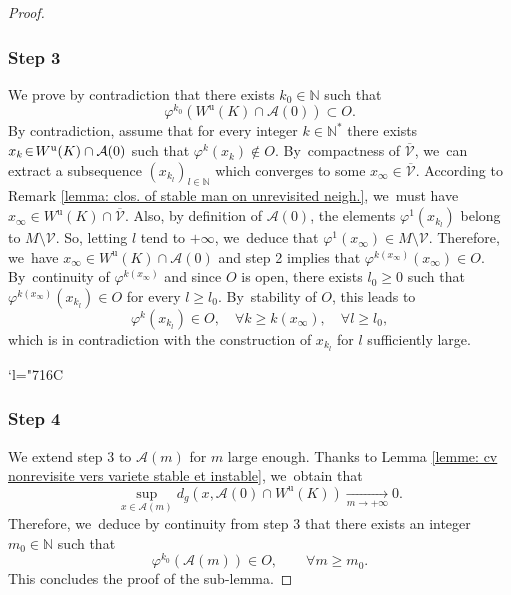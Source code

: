\documentclass[JEP,XML,SOM,Unicode,NoEqCountersInSection,NoFloatCountersInSection,published]{cedram}
\newcommand{\Changelback}{\mathcode`l="716C}
\newcommand{\ru}{\mathrm{u}}
\theoremstyle{definition}
\theoremstyle{plain}
\newcommand{\Acal}{\mathcal{A}}
\newcommand{\N}{\mathbb{N}}
\newcommand{\Vcal}{\mathcal{V}}
\begin{document}
\begin{proof}
\subsubsection*{Step 3} We prove by contradiction that there exists $k_0 \in \N$ such that
\[
\varphi^{k_0} (W^\ru (K) \cap \Acal(0)) \subset O.
\]
By contradiction, assume that for every integer $k \in \N^*$ there exists $x_k\!\in\! W^\ru (K) \cap\nobreak \Acal (0)$ such that $\varphi^{k} (x_k) \notin O$. By~compactness of $\overline{\Vcal}$, we~can extract a subsequence $(x_{k_l})_{l \in \N}$ which converges to some $x_{\infty} \in \overline{\Vcal}$. According to Remark \ref{lemma: clos. of stable man on unrevisited neigh.}, we~must have $x_{\infty} \in W^\ru (K) \cap \overline{\Vcal}$. Also, by definition of $\Acal (0)$, the elements $\varphi^1 (x_{k_l})$ belong to $M \setminus \Vcal$. So, letting $l$ tend to $+\infty$, we~deduce that $\varphi^1 (x_{\infty}) \in M \setminus \Vcal $. Therefore, we~have $x_{\infty} \in W^\ru (K) \cap \Acal (0)$ and step 2 implies that $\varphi^{k (x_{\infty})} (x_{\infty}) \in O$. By~continuity of $\varphi^{k (x_{\infty})}$ and since $O$ is open, there exists $l_0 \geq 0$ such that $\varphi^{k (x_{\infty})} (x_{k_l}) \in O$ for every $l \geq l_0$. By~stability of $O$, this leads to
\[
\varphi^{k} (x_{k_l}) \in O, \quad \forall k \geq k(x_{\infty}), \quad \forall l \geq l_0,
\]
which is in contradiction with the construction of $x_{k_l}$ for $l$ sufficiently large.

\Changelback

\subsubsection*{Step 4} We extend step 3 to $\Acal (m)$ for $m$ large enough. Thanks to Lemma \ref{lemme: cv nonrevisite vers variete stable et instable}, we~obtain that
\[
\sup_{x \in \Acal (m) } d_g \left(x, \Acal (0) \cap W^\ru(K) \right) \underset{m \to +\infty}{\to} 0.
\]
Therefore, we~deduce by continuity from step 3 that there exists an integer $m_0 \in \N$ such that
\begin{equation}\label{eq: lemme filtration cv uniform R(n)}
\varphi^{ k_0} (\Acal (m)) \in O, \qquad \forall m \geq m_0.
\end{equation}
This concludes the proof of the sub-lemma.
\end{proof}
\end{document}
